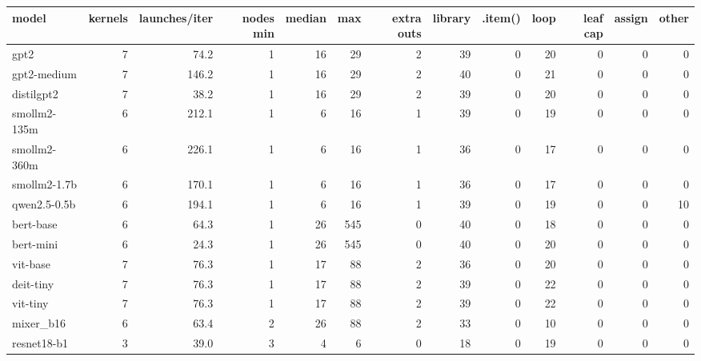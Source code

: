 \begin{tabular}{lrrrrrrrrrrrr}
\toprule
model & kernels & launches/iter & nodes min & median & max & extra outs & library & .item() & loop & leaf cap & assign & other \\
\midrule
gpt2 & 7 & 74.2 & 1 & 16 & 29 & 2 & 39 & 0 & 20 & 0 & 0 & 0 \\
gpt2-medium & 7 & 146.2 & 1 & 16 & 29 & 2 & 40 & 0 & 21 & 0 & 0 & 0 \\
distilgpt2 & 7 & 38.2 & 1 & 16 & 29 & 2 & 39 & 0 & 20 & 0 & 0 & 0 \\
smollm2-135m & 6 & 212.1 & 1 & 6 & 16 & 1 & 39 & 0 & 19 & 0 & 0 & 0 \\
smollm2-360m & 6 & 226.1 & 1 & 6 & 16 & 1 & 36 & 0 & 17 & 0 & 0 & 0 \\
smollm2-1.7b & 6 & 170.1 & 1 & 6 & 16 & 1 & 36 & 0 & 17 & 0 & 0 & 0 \\
qwen2.5-0.5b & 6 & 194.1 & 1 & 6 & 16 & 1 & 39 & 0 & 19 & 0 & 0 & 10 \\
bert-base & 6 & 64.3 & 1 & 26 & 545 & 0 & 40 & 0 & 18 & 0 & 0 & 0 \\
bert-mini & 6 & 24.3 & 1 & 26 & 545 & 0 & 40 & 0 & 20 & 0 & 0 & 0 \\
vit-base & 7 & 76.3 & 1 & 17 & 88 & 2 & 36 & 0 & 20 & 0 & 0 & 0 \\
deit-tiny & 7 & 76.3 & 1 & 17 & 88 & 2 & 39 & 0 & 22 & 0 & 0 & 0 \\
vit-tiny & 7 & 76.3 & 1 & 17 & 88 & 2 & 39 & 0 & 22 & 0 & 0 & 0 \\
mixer\_b16 & 6 & 63.4 & 2 & 26 & 88 & 2 & 33 & 0 & 10 & 0 & 0 & 0 \\
resnet18-b1 & 3 & 39.0 & 3 & 4 & 6 & 0 & 18 & 0 & 19 & 0 & 0 & 0 \\
\bottomrule
\end{tabular}

